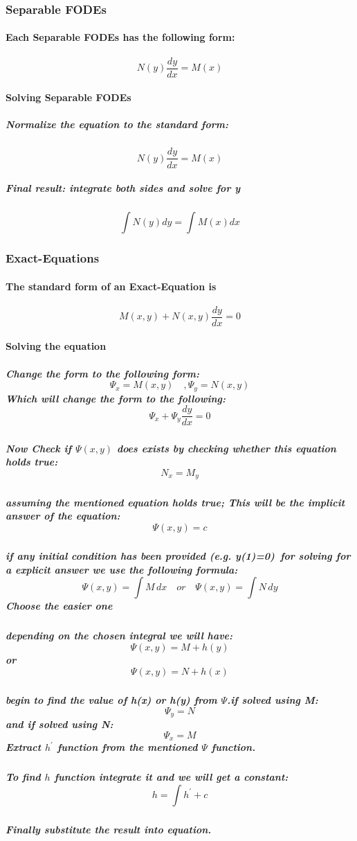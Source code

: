 \documentclass{article}
\begin{document}
\subsubsection{Separable FODEs}
\paragraph{Each Separable FODEs has the following form:}
\[N(y)\frac{dy}{dx}=M(x)\]
\paragraph{Solving Separable FODEs}
\subparagraph{Normalize the equation to the standard form:}
\[N(y)\frac{dy}{dx}=M(x)\]
\subparagraph{Final result: integrate both sides and solve for y}
\[\int{N(y)dy}=\int{M(x)dx}\]
\subsubsection{Exact-Equations}
\paragraph{The standard form of an Exact-Equation is}
\[M(x,y)+N(x,y)\frac{dy}{dx}=0\]
\paragraph{Solving the equation}
\subparagraph{Change the form to the following form:
\[\Psi_{x}=M(x,y)\quad,\Psi_{y}=N(x,y)\]
Which will change the form to the following:
\[\Psi_{x}+\Psi_{y}\frac{dy}{dx}=0\]
}
\subparagraph{Now Check if $\Psi(x,y)$ does exists by checking whether this equation holds true:
	\[N_{x}=M_{y}\]
}
\subparagraph{assuming the mentioned equation holds true; This will be the implicit answer of the equation:
	\[\Psi(x,y)=c\]
}
\subparagraph{if any initial condition has been provided (e.g. y(1)=0)\, for solving for a explicit answer we use the following formula:
	\[\Psi(x,y)=\int{M\,dx}\quad or \quad \Psi(x,y)=\int{N\,dy}\]
Choose the easier one
}
\subparagraph{depending on the chosen integral we will have:
	\[\Psi(x,y)=M+h(y)\]
	or
	\[\Psi(x,y)=N+h(x)\]
}
\subparagraph{begin to find the value of h(x) or h(y) from $\Psi$.if solved using M:
	\[\Psi_{y}=N\]
	and if solved using N:
	\[\Psi_{x}=M\]
	Extract $h^{'}$ function from the mentioned $\Psi$ function.
}
\subparagraph{To find $h$ function integrate it and we will get a constant:
	\[h=\int{h^{'}} +c \]
}
\subparagraph{Finally substitute the result into equation.}
\end{document}
